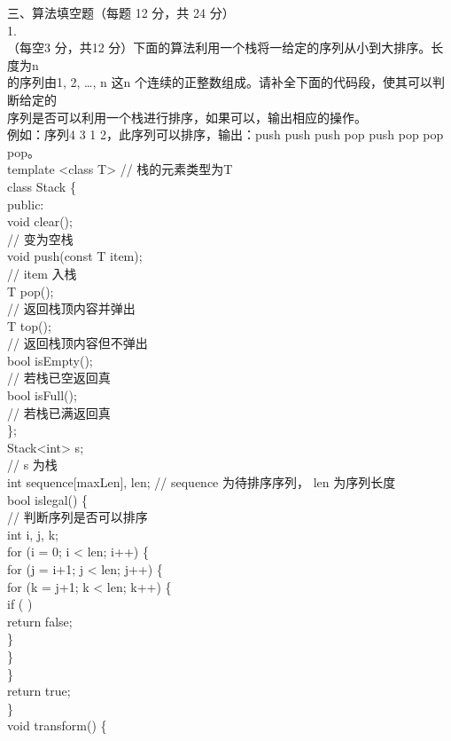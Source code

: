 \begin{question}
三、算法填空题（每题 12 分，共 24 分）\\
1.\\
（每空3 分，共12 分）下面的算法利用一个栈将一给定的序列从小到大排序。长度为n\\
的序列由1, 2, …, n 这n 个连续的正整数组成。请补全下面的代码段，使其可以判断给定的\\
序列是否可以利用一个栈进行排序，如果可以，输出相应的操作。\\
例如：序列4 3 1 2，此序列可以排序，输出：push push push pop push pop pop pop。\\
template <class T>                            // 栈的元素类型为T\\
class Stack \{\\
public:\\
void clear();\\
// 变为空栈\\
void push(const T item);\\
//  item 入栈\\
T pop();\\
// 返回栈顶内容并弹出\\
T top();\\
// 返回栈顶内容但不弹出\\
bool isEmpty();\\
// 若栈已空返回真\\
bool isFull();\\
// 若栈已满返回真\\
\};\\
Stack<int> s;\\
//  s 为栈\\
int sequence[maxLen],  len;                 // sequence 为待排序序列， len 为序列长度\\
bool islegal()  \{\\
// 判断序列是否可以排序\\
int i, j, k;\\
for (i = 0; i < len; i++) \{\\
for (j = i+1; j < len; j++) \{\\
for (k = j+1; k < len; k++) \{\\
if (            )\\
return false;\\
\}\\
\}\\
\}\\
return true;\\
\}\\
void transform()  \{\\

\end{question}
